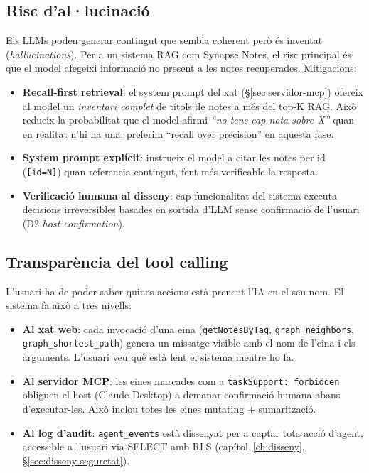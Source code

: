 \subsection{Risc d'al·lucinació}

Els LLMs poden generar contingut que sembla coherent però és inventat (\emph{hallucinations}). Per a un sistema RAG com Synapse Notes, el risc principal és que el model afegeixi informació no present a les notes recuperades. Mitigacions:

\begin{itemize}
    \item \textbf{Recall-first retrieval}: el system prompt del xat (\S\ref{sec:servidor-mcp}) ofereix al model un \emph{inventari complet} de títols de notes a més del top-K RAG. Això redueix la probabilitat que el model afirmi \emph{``no tens cap nota sobre X''} quan en realitat n'hi ha una; preferim ``recall over precision'' en aquesta fase.
    \item \textbf{System prompt explícit}: instrueix el model a citar les notes per id (\texttt{[id=N]}) quan referencia contingut, fent més verificable la resposta.
    \item \textbf{Verificació humana al disseny}: cap funcionalitat del sistema executa decisions irreversibles basades en sortida d'LLM sense confirmació de l'usuari (D2 \emph{host confirmation}).
\end{itemize}

\subsection{Transparència del tool calling}

L'usuari ha de poder saber quines accions està prenent l'IA en el seu nom. El sistema fa això a tres nivells:

\begin{itemize}
    \item \textbf{Al xat web}: cada invocació d'una eina (\texttt{getNotesByTag}, \texttt{graph\_neighbors}, \texttt{graph\_shortest\_path}) genera un missatge visible amb el nom de l'eina i els arguments. L'usuari veu què està fent el sistema mentre ho fa.
    \item \textbf{Al servidor MCP}: les eines marcades com a \texttt{taskSupport: forbidden} obliguen el host (Claude Desktop) a demanar confirmació humana abans d'executar-les. Això inclou totes les eines mutating + sumarització.
    \item \textbf{Al log d'audit}: \texttt{agent\_events} està dissenyat per a captar tota acció d'agent, accessible a l'usuari via SELECT amb RLS (capítol~\ref{ch:disseny}, \S\ref{sec:disseny-seguretat}).
\end{itemize}

